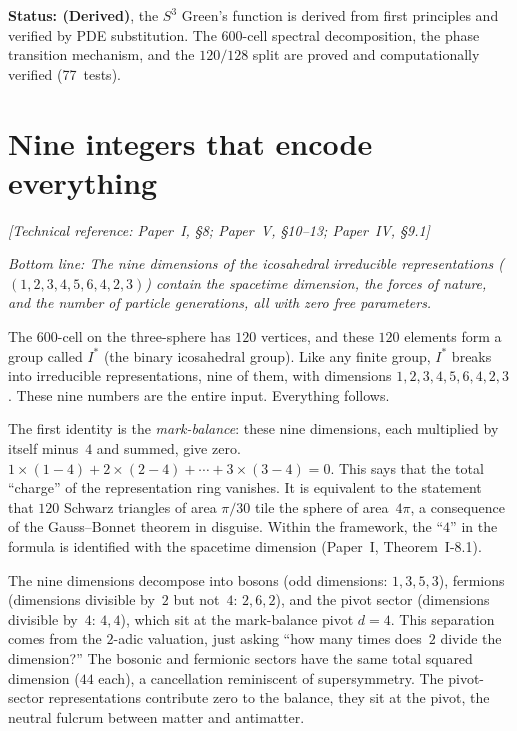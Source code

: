 \textbf{Status: (Derived)}, the $S^3$ Green's function is derived from
first principles and verified by PDE substitution. The 600-cell
spectral decomposition, the phase transition mechanism, and the
$120/128$ split are proved and computationally verified (77~tests).

\section{Nine integers that encode everything}
\noindent\textit{[Technical reference: Paper~I, \S8; Paper~V, \S10--13; Paper~IV, \S9.1]}

\medskip

\noindent\textit{Bottom line: The nine dimensions of the icosahedral
irreducible representations ($(1, 2, 3, 4, 5, 6, 4, 2, 3)$) contain
the spacetime dimension, the forces of nature, and the number of particle
generations, all with zero free parameters.}

\medskip

The 600-cell on the three-sphere has $120$ vertices, and these
$120$ elements form a group called $I^*$ (the binary icosahedral group).
Like any finite group, $I^*$ breaks into irreducible representations, nine
of them, with dimensions $1, 2, 3, 4, 5, 6, 4, 2, 3$.
These nine numbers are the entire input.  Everything follows.

The first identity is the \emph{mark-balance}: these nine dimensions,
each multiplied by itself minus~$4$ and summed, give zero.
$1 \times (1{-}4) + 2 \times (2{-}4) + \cdots + 3 \times (3{-}4) = 0$.
This says that the total ``charge'' of the representation ring
vanishes.  It is equivalent to the statement that $120$ Schwarz
triangles of area $\pi/30$ tile the sphere of area~$4\pi$, a
consequence of the Gauss--Bonnet theorem in disguise.
Within the framework, the ``$4$'' in the formula is identified
with the spacetime dimension (Paper~I, Theorem~I-8.1).

The nine dimensions decompose into bosons (odd dimensions: $1, 3, 5, 3$),
fermions (dimensions divisible by~$2$ but not~$4$: $2, 6, 2$), and
the pivot sector (dimensions divisible by~$4$: $4, 4$), which sit at the
mark-balance pivot $d = 4$.  This separation comes from the
$2$-adic valuation, just asking ``how many times does~$2$ divide the
dimension?''  The bosonic and fermionic sectors have the same total
squared dimension ($44$ each), a cancellation reminiscent of supersymmetry.
The pivot-sector representations contribute zero to the balance, they sit at the pivot,
the neutral fulcrum between matter and antimatter.

